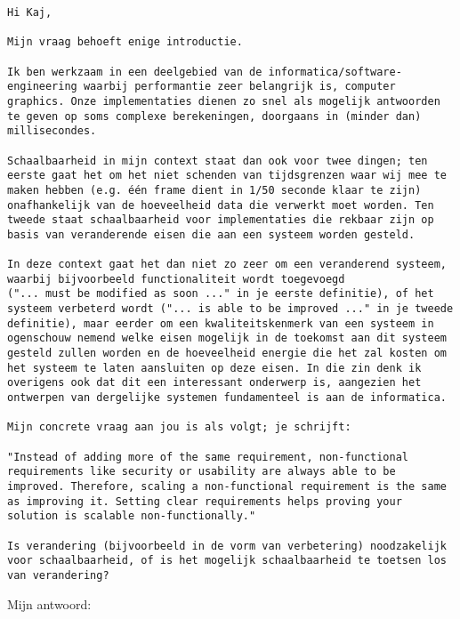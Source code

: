\begin{verbatim}
Hi Kaj,

Mijn vraag behoeft enige introductie.

Ik ben werkzaam in een deelgebied van de informatica/software-engineering waarbij performantie zeer belangrijk is, computer graphics. Onze implementaties dienen zo snel als mogelijk antwoorden te geven op soms complexe berekeningen, doorgaans in (minder dan) millisecondes.

Schaalbaarheid in mijn context staat dan ook voor twee dingen; ten eerste gaat het om het niet schenden van tijdsgrenzen waar wij mee te maken hebben (e.g. één frame dient in 1/50 seconde klaar te zijn) onafhankelijk van de hoeveelheid data die verwerkt moet worden. Ten tweede staat schaalbaarheid voor implementaties die rekbaar zijn op basis van veranderende eisen die aan een systeem worden gesteld.

In deze context gaat het dan niet zo zeer om een veranderend systeem, waarbij bijvoorbeeld functionaliteit wordt toegevoegd
("... must be modified as soon ..." in je eerste definitie), of het systeem verbeterd wordt ("... is able to be improved ..." in je tweede definitie), maar eerder om een kwaliteitskenmerk van een systeem in ogenschouw nemend welke eisen mogelijk in de toekomst aan dit systeem gesteld zullen worden en de hoeveelheid energie die het zal kosten om het systeem te laten aansluiten op deze eisen. In die zin denk ik overigens ook dat dit een interessant onderwerp is, aangezien het ontwerpen van dergelijke systemen fundamenteel is aan de informatica.

Mijn concrete vraag aan jou is als volgt; je schrijft:

"Instead of adding more of the same requirement, non-functional requirements like security or usability are always able to be improved. Therefore, scaling a non-functional requirement is the same as improving it. Setting clear requirements helps proving your solution is scalable non-functionally."

Is verandering (bijvoorbeeld in de vorm van verbetering) noodzakelijk voor schaalbaarheid, of is het mogelijk schaalbaarheid te toetsen los van verandering?
\end{verbatim}
Mijn antwoord:
